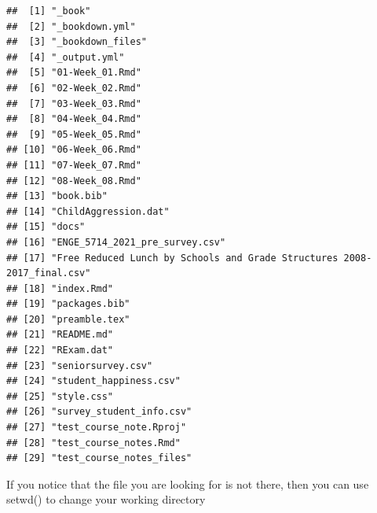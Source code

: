\documentclass[
]{book}
\begin{document}
\begin{verbatim}
##  [1] "_book"                                                                 
##  [2] "_bookdown.yml"                                                         
##  [3] "_bookdown_files"                                                       
##  [4] "_output.yml"                                                           
##  [5] "01-Week_01.Rmd"                                                        
##  [6] "02-Week_02.Rmd"                                                        
##  [7] "03-Week_03.Rmd"                                                        
##  [8] "04-Week_04.Rmd"                                                        
##  [9] "05-Week_05.Rmd"                                                        
## [10] "06-Week_06.Rmd"                                                        
## [11] "07-Week_07.Rmd"                                                        
## [12] "08-Week_08.Rmd"                                                        
## [13] "book.bib"                                                              
## [14] "ChildAggression.dat"                                                   
## [15] "docs"                                                                  
## [16] "ENGE_5714_2021_pre_survey.csv"                                         
## [17] "Free Reduced Lunch by Schools and Grade Structures 2008-2017_final.csv"
## [18] "index.Rmd"                                                             
## [19] "packages.bib"                                                          
## [20] "preamble.tex"                                                          
## [21] "README.md"                                                             
## [22] "RExam.dat"                                                             
## [23] "seniorsurvey.csv"                                                      
## [24] "student_happiness.csv"                                                 
## [25] "style.css"                                                             
## [26] "survey_student_info.csv"                                               
## [27] "test_course_note.Rproj"                                                
## [28] "test_course_notes.Rmd"                                                 
## [29] "test_course_notes_files"
\end{verbatim}

If you notice that the file you are looking for is not there, then you can use setwd() to change your working directory
\end{document}
